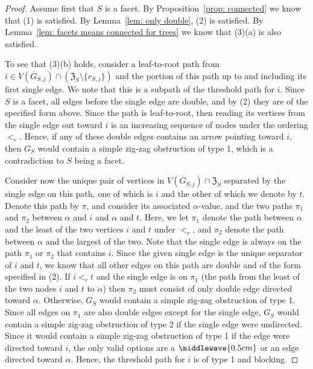 \begin{proof}
Assume first that $S$ is a facet.  
By Proposition~\ref{prop: connected} we know that (1) is satisfied.  
By Lemma~\ref{lem: only double}, (2) is satisfied.
By Lemma~\ref{lem: facets means connected for trees} we know that (3)(a) is also satisfied. 

To see that (3)(b) holds, consider a leaf-to-root path from $i\in V(\overline{G}_{S,j})\cap(\mathfrak{Z}_S\setminus\{r_{S,j}\})$ and the portion of this path up to and including its first single edge. 
We note that this is a subpath of the threshold path for $i$.  
Since $S$ is a facet, all edges before the single edge are double, and by (2) they are of the specified form above. 
Since the path is leaf-to-root, then reading its vertices from the single edge out toward $i$ is an increasing sequence of nodes under the ordering $<_r$.  
Hence, if any of these double edges contains an arrow pointing toward $i$, then $G_S$ would contain a simple zig-zag obstruction of type 1, which is a contradiction to $S$ being a facet. 

Consider now the unique pair of vertices in $V(\overline{G}_{S,j})\cap\mathfrak{Z}_S$ separated by the single edge on this path, one of which is $i$ and the other of which we denote by $t$. 
Denote this path by $\pi$, and consider its associated $\alpha$-value, and the two paths $\pi_1$ and $\pi_2$ between $\alpha$ and $i$ and $\alpha$ and $t$. 
Here, we let $\pi_1$ denote the path between $\alpha$ and the least of the two vertices $i$ and $t$ under $<_r$, and $\pi_2$ denote the path between $\alpha$ and the largest of the two.
Note that the single edge is always on the path $\pi_1$ or $\pi_2$ that contains $i$.
Since the given single edge is the unique separator of $i$ and $t$, we know that all other edges on this path are double and of the form specified in (2). 
If $i <_r t$ and the single edge is on $\pi_1$ 
(the path from the least of the two nodes $i$ and $t$ to $\alpha$) then $\pi_2$ must consist of only double edge directed toward $\alpha$. 
Otherwise, $G_S$ would contain a simple zig-zag obstruction of type 1.  
Since all edges on $\pi_1$ are also double edges except for the single edge, $G_S$ would contain a simple zig-zag obstruction of type 2 if the single edge were undirected. 
Since it would contain a simple zig-zag obstruction of type 1 if the edge were directed toward $i$, the only valid options are a $\middlewave{0.5cm}$ or an edge directed toward $\alpha$.  
Hence, the threshold path for $i$ is of type 1 and blocking. 


\end{proof}
